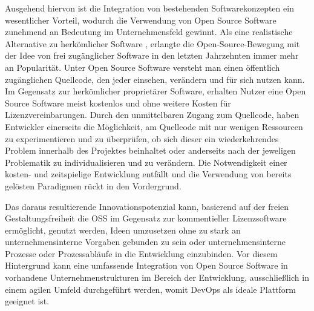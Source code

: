 Ausgehend hiervon ist die Integration von bestehenden Softwarekonzepten  ein wesentlicher Vorteil, wodurch die Verwendung von Open Source Software zunehmend an Bedeutung im Unternehmensfeld gewinnt.
Als eine realistische Alternative zu herkömlicher Software , erlangte die Open-Source-Bewegung  mit der Idee von frei zugänglicher Software in den letzten Jahrzehnten immer mehr an Popularität.
Unter Open Source Software versteht man einen öffentlich zugänglichen Quellcode, den jeder einsehen, verändern und für sich nutzen kann.
Im Gegensatz zur herkömlicher proprietärer Software, erhalten Nutzer eine Open Source Software meist kostenlos und ohne weitere Kosten  für Lizenzvereinbarungen.
Durch den unmittelbaren Zugang zum Quellcode, haben Entwickler einerseits die Möglichkeit, am Quellcode mit nur wenigen Ressourcen zu experimentieren und zu überprüfen, ob sich dieser ein wiederkehrendes Problem innerhalb des Projektes beinhaltet oder anderseits nach der jeweligen Problematik zu individualisieren und zu verändern.
Die Notwendigkeit einer kosten- und zeitspielige Entwicklung entfällt und die Verwendung von bereits gelösten Paradigmen  rückt in den Vordergrund.   


Das daraus resultierende Innovationspotenzial kann, basierend auf der freien Gestaltungsfreiheit die OSS  im Gegensatz zur kommentieller Lizenzsoftware  ermöglicht, genutzt werden, Ideen umzusetzen ohne zu stark an unternehmensinterne Vorgaben gebunden zu sein oder unternehmensinterne Prozesse oder Prozessabläufe in die Entwicklung einzubinden. 
Vor diesem Hintergrund kann eine umfassende Integration von Open Source Software in vorhandene Unternehmenstrukturen im Bereich der Entwicklung, ausschließlich  in einem agilen Umfeld durchgeführt werden, womit DevOps als ideale Plattform geeignet ist. 

